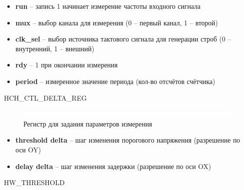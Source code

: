 \noindent
\begin{itemize}[label={}]
	\item \textbf{run} -- запись 1 начинает измерение частоты входного сигнала
	\item \textbf{mux} -- выбор канала для измерения (0 -- первый канал, 1 -- второй)
	\item \textbf{clk\_sel} -- выбор источника тактового сигнала для генерации строб (0 -- внутренний, 1 -- внешний)
	\item \textbf{rdy} -- 1 при окончании измерения
	\item \textbf{period} -- измеренное значение периода (кол-во отсчётов счётчика)\\
\end{itemize}

\begin{register}{H}{CH\_CTL\_DELTA\_REG}{}%
\label{example}%
%
%
%
 \regnewline%

\end{register}


\begin{figure}[ht!] 
	\center
	\includegraphics  {my_folder/images//blank}
	\caption{Регистр для задания параметров измерения} 
	\label{fig:delta-reg}  
\end{figure}
\FloatBarrier

\noindent
\begin{itemize}[label={}]
	\item \textbf{threshold delta} -- шаг изменения порогового напряжения (разрешение по оси OY)
	\item \textbf{delay delta} -- шаг изменения задержки (разрешение по оси OX)\\
\end{itemize}


\begin{register}{H}{W\_THRESHOLD}{}%
\label{example}%
%
%
%
 \regnewline%

%
%
\regnewline%
\end{register}

